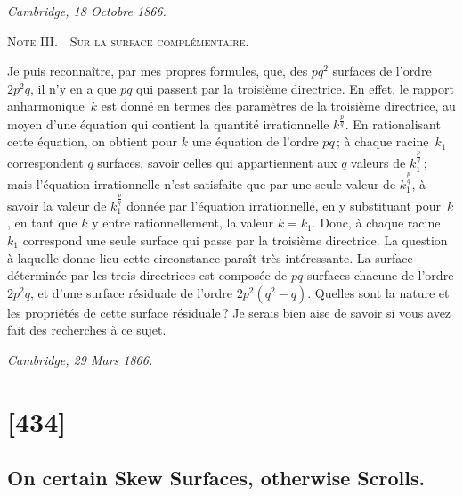 \documentclass[11pt,a4paper]{article}
\begin{document}
\begin{flushright}
\textit{Cambridge, 18 Octobre 1866.}
\end{flushright}

\medskip\noindent
\textsc{Note III.\ \ Sur la surface compl\'ementaire.}
\medskip

Je puis reconna\^itre, par mes propres formules, que, des $pq^{2}$ surfaces de
l'ordre $2p^{2}q$, il n'y en a que $pq$ qui passent par la troisi\`eme directrice.
En effet, le rapport anharmonique~$k$ est donn\'e en termes des param\`etres de la
troisi\`eme directrice, au moyen d'une \'equation qui contient la quantit\'e
irrationnelle $k^{\tfrac{p}{q}}$. En rationalisant cette \'equation, on obtient
pour $k$ une \'equation de l'ordre $pq$\,; \`a chaque racine~$k_{1}$ correspondent
$q$ surfaces, savoir celles qui appartiennent aux $q$ valeurs de $k_{1}^{\tfrac{p}{q}}$\,;
mais l'\'equation irrationnelle n'est satisfaite que par une seule valeur de
$k_{1}^{\tfrac{p}{q}}$, \`a savoir la valeur de $k_{1}^{\tfrac{p}{q}}$ donn\'ee par
l'\'equation irrationnelle, en y substituant pour~$k$, en tant que $k$ y entre
rationnellement, la valeur $k = k_{1}$. Donc, \`a chaque racine $k_{1}$ correspond
une seule surface qui passe par la troisi\`eme directrice. La question \`a laquelle
donne lieu cette circonstance para\^it tr\`es-int\'eressante. La surface
d\'etermin\'ee par les trois directrices est compos\'ee de $pq$ surfaces chacune
de l'ordre $2p^{2}q$, et d'une surface r\'esiduale de l'ordre $2p^{2}(q^{2} - q)$.
Quelles sont la nature et les propri\'et\'es de cette surface r\'esiduale\,? Je
serais bien aise de savoir si vous avez fait des recherches \`a ce sujet.

\begin{flushright}
\textit{Cambridge, 29 Mars 1866.}
\end{flushright}

\clearpage


\section{[434]}
\subsection{On certain Skew Surfaces, otherwise Scrolls.}
\end{document}
